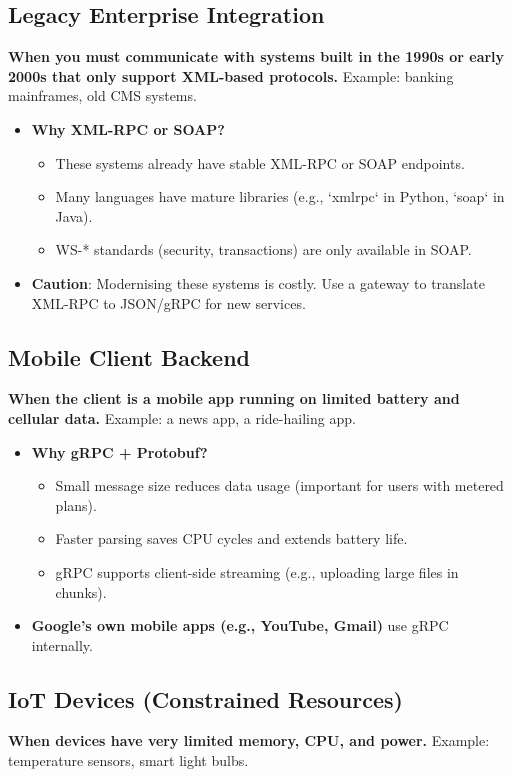 \documentclass[10pt,a4paper]{article}
\begin{document}
\subsection{Legacy Enterprise Integration}
\textbf{When you must communicate with systems built in the 1990s or early 2000s that only support XML-based protocols.} Example: banking mainframes, old CMS systems.

\begin{itemize}
    \item \textbf{Why XML-RPC or SOAP?}
        \begin{itemize}
            \item These systems already have stable XML-RPC or SOAP endpoints.
            \item Many languages have mature libraries (e.g., `xmlrpc` in Python, `soap` in Java).
            \item WS-* standards (security, transactions) are only available in SOAP.
        \end{itemize}
    \item \textbf{Caution}: Modernising these systems is costly. Use a gateway to translate XML-RPC to JSON/gRPC for new services.
\end{itemize}

\subsection{Mobile Client Backend}
\textbf{When the client is a mobile app running on limited battery and cellular data.} Example: a news app, a ride-hailing app.

\begin{itemize}
    \item \textbf{Why gRPC + Protobuf?}
        \begin{itemize}
            \item Small message size reduces data usage (important for users with metered plans).
            \item Faster parsing saves CPU cycles and extends battery life.
            \item gRPC supports client-side streaming (e.g., uploading large files in chunks).
        \end{itemize}
    \item \textbf{Google’s own mobile apps (e.g., YouTube, Gmail)} use gRPC internally.
\end{itemize}

\subsection{IoT Devices (Constrained Resources)}
\textbf{When devices have very limited memory, CPU, and power.} Example: temperature sensors, smart light bulbs.
\end{document}
